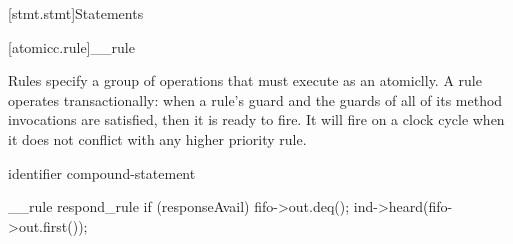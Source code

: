 [stmt.stmt]{Statements}%


[atomicc.rule]{__rule}

Rules specify a group of operations that must execute as an atomiclly.
A rule operates
transactionally: when a rule's guard and the guards of all of its
method invocations are satisfied, then it is ready to fire. It will
fire on a clock cycle when it does not conflict with any higher
priority rule.

\begin{bnf}
\br
     identifier  compound-statement\br

\end{bnf}

\begin{example}
\begin{codeblock}
     __rule respond_rule if (responseAvail) {
         fifo->out.deq();
         ind->heard(fifo->out.first());
     }
\end{codeblock}
\end{example}
